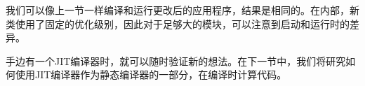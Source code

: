 我们可以像上一节一样编译和运行更改后的应用程序，结果是相同的。在内部，新类使用了固定的优化级别，因此对于足够大的模块，可以注意到启动和运行时的差异。\par

手边有一个JIT编译器时，就可以随时验证新的想法。在下一节中，我们将研究如何使用JIT编译器作为静态编译器的一部分，在编译时计算代码。\par













